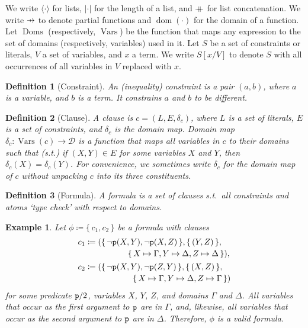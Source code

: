 \documentclass{article}
\newtheorem{example}{Example}
\newtheorem{definition}{Definition}
\newcommand\pfun{\mathrel{\ooalign{\hfil$\mapstochar\mkern5mu$\hfil\cr$\to$\cr}}}
\newcommand\mdoubleplus{\mathbin{+\mkern-10mu+}}
\newcommand{\predicate}{\texttt{\textup{p}}}
\DeclareMathOperator{\dom}{dom}
\DeclareMathOperator{\Doms}{Doms}
\DeclareMathOperator{\Vars}{Vars}
\begin{document}
We write $\langle\cdot\rangle$ for lists, $|\cdot|$ for the length of a list,
and $\mdoubleplus$ for list concatenation. We write $\pfun$ to denote partial
functions and $\dom(\cdot)$ for the domain of a function. Let $\Doms$
(respectively, $\Vars$) be the function that maps any expression to the set of
domains (respectively, variables) used in it. Let $S$ be a set of constraints or
literals, $V$ a set of variables, and $x$ a term. We write $S[x/V]$ to denote
$S$ with all occurrences of all variables in $V$ replaced with $x$.

\begin{definition}[Constraint]\label{def:constraint}
  An \emph{(inequality) constraint} is a pair $(a, b)$, where $a$ is a variable,
  and $b$ is a term. It constrains $a$ and $b$ to be different.
\end{definition}

\begin{definition}[Clause]\label{def:clause}
  A \emph{clause} is $c = (L, E, \delta_c)$, where $L$ is a set of literals, $E$
  is a set of constraints, and $\delta_c$ is the domain map. \emph{Domain map}
  $\delta_{c}\colon \Vars(c) \to \mathcal{D}$ is a function that maps all
  variables in $c$ to their domains such that (s.t.) if $(X, Y) \in E$ for some
  variables $X$ and $Y$, then $\delta_c(X) = \delta_c(Y)$. For convenience, we
  sometimes write $\delta_c$ for the domain map of $c$ without unpacking $c$
  into its three constituents.
\end{definition}

\begin{definition}[Formula]\label{def:formula}
  A \emph{formula} is a set of clauses s.t.\ all constraints and atoms `type
  check' with respect to domains.
\end{definition}

\begin{example}\label{example:first}
  Let $\phi \coloneqq \{\, c_1, c_2 \,\}$ be a formula with clauses
  \begin{align*}
    c_1 &\coloneqq
          \begin{multlined}[t]
            (\{\, \neg \predicate(X, Y), \neg \predicate(X, Z) \,\}, \{\, (Y, Z) \,\}, \\
            \{\, X \mapsto \Gamma, Y \mapsto \Delta, Z \mapsto \Delta \,\}),
          \end{multlined}\\
    c_2 &\coloneqq
          \begin{multlined}[t]
            (\{\, \neg \predicate(X, Y), \neg \predicate(Z, Y) \,\}, \{\, (X, Z) \,\}, \\
            \{\, X \mapsto \Gamma, Y \mapsto \Delta, Z \mapsto \Gamma \,\})
          \end{multlined}
  \end{align*}
  for some predicate $\predicate/2$, variables $X$, $Y$, $Z$, and domains
  $\Gamma$ and $\Delta$. All variables that occur as the first argument to
  $\predicate$ are in $\Gamma$, and, likewise, all variables that occur as the
  second argument to $\predicate$ are in $\Delta$. Therefore, $\phi$ is a valid
  formula.
\end{example}
\end{document}
